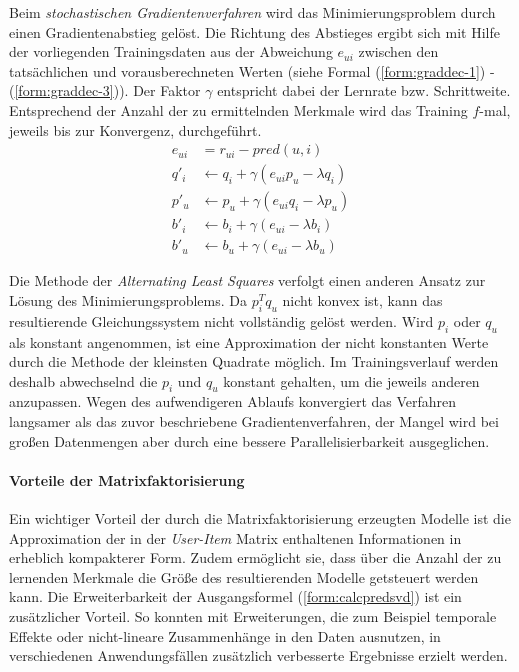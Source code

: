 Beim \textit{stochastischen Gradientenverfahren} \citep{funk2006} wird das Minimierungsproblem durch einen Gradientenabstieg gelöst. Die Richtung des Abstieges  ergibt sich mit Hilfe der vorliegenden Trainingsdaten aus der Abweichung $e_{ui}$ zwischen den tatsächlichen und vorausberechneten Werten (siehe Formal (\ref{form:graddec-1}) - (\ref{form:graddec-3})). Der Faktor $\gamma$ entspricht dabei der Lernrate bzw. Schrittweite. Entsprechend der Anzahl der zu ermittelnden Merkmale wird das Training $f$-mal, jeweils bis zur Konvergenz, durchgeführt. \citep{funk2006,Langford09,hb_05}
\begin{align}
e_{ui} & =  r_{ui} - pred(u,i) \label{form:graddec-1} \\
q'_i & \gets q_i + \gamma (e_{ui} p_u - \lambda q_i ) \label{form:graddec-2} \\
p'_u & \gets p_u + \gamma (e_{ui} q_i - \lambda p_u) \\
b'_i & \gets b_i + \gamma (e_{ui} - \lambda b_i) \\
b'_u & \gets b_u + \gamma (e_{ui} - \lambda b_u) \label{form:graddec-3}
\end{align}

Die Methode der \textit{Alternating Least Squares} \citep{Bell:2007:SCF:1441428.1442050} verfolgt einen anderen Ansatz zur Lösung des Minimierungsproblems. Da $ p_i^T q_u $ nicht konvex ist, kann das resultierende Gleichungssystem nicht vollständig gelöst werden. Wird $p_i$ oder $q_u$ als konstant angenommen, ist eine Approximation der nicht konstanten Werte durch die Methode der kleinsten Quadrate möglich. Im Trainingsverlauf werden deshalb abwechselnd die $p_i$ und $q_u$ konstant gehalten, um die jeweils anderen anzupassen. Wegen des aufwendigeren Ablaufs konvergiert das Verfahren langsamer als das zuvor beschriebene Gradientenverfahren, der Mangel wird bei großen Datenmengen aber durch eine bessere Parallelisierbarkeit ausgeglichen. \citep{Bell:2007:SCF:1441428.1442050, hb_05} %

\paragraph{Vorteile der Matrixfaktorisierung} Ein wichtiger Vorteil der durch die Matrixfaktorisierung erzeugten Modelle ist die Approximation der in der \textit{User-Item} Matrix enthaltenen Informationen in erheblich kompakterer Form. Zudem ermöglicht sie, dass über die Anzahl der zu lernenden Merkmale die Größe des resultierenden Modelle getsteuert werden kann. Die Erweiterbarkeit der Ausgangsformel (\ref{form:calcpredsvd}) ist ein zusätzlicher Vorteil. So konnten mit Erweiterungen, die zum Beispiel temporale Effekte oder nicht-lineare Zusammenhänge in den Daten ausnutzen, in verschiedenen Anwendungsfällen zusätzlich verbesserte Ergebnisse erzielt werden. \citep{hb_05,Vozalis:2007:USD:1243505.1243639}

